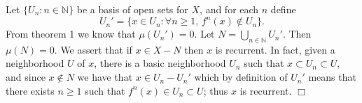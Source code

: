 \documentclass[12pt]{article}
\newcommand{\N}{\mathbb{N}}
\begin{document}
Let $\{U_n : n\in \N\}$ be a basis of open sets for $X$, and for each $n$ define
$$U_n' = \{x\in U_n : \forall n\geq 1,\, f^n(x) \notin U_n \}.$$
From theorem 1 we know that $\mu(U_n')=0$. Let $N=\bigcup_{n\in \N} U_n'.$
Then $\mu(N)=0$. We assert that if $x\in X-N$ then $x$ is recurrent. In fact,
given a neighborhood $U$ of $x$, there is a basic neighborhood $U_n$ such that $x\subset U_n\subset U$, and since $x\notin N$ we have that $x\in U_n-U_n'$ which by definition of $U_n'$ means that there exists $n\geq 1$ such that $f^n(x)\in U_n\subset U$; thus $x$ is recurrent. $\Box$
\end{document}
